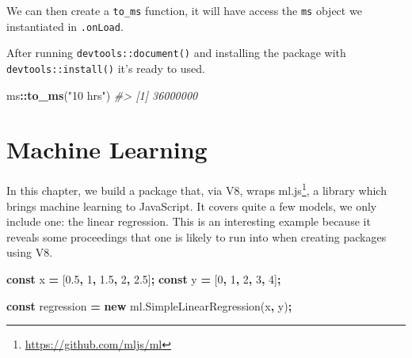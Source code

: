 \documentclass[
]{krantz}
\makeatletter
\newenvironment{Shaded}{\begin{snugshade}}{\end{snugshade}}
\newcommand{\AttributeTok}[1]{\textcolor[rgb]{0.61,0.61,0.61}{#1}}
\newcommand{\CommentTok}[1]{\textcolor[rgb]{0.37,0.37,0.37}{\textit{#1}}}
\newcommand{\ControlFlowTok}[1]{\textcolor[rgb]{0.27,0.27,0.27}{\textbf{#1}}}
\newcommand{\DecValTok}[1]{\textcolor[rgb]{0.06,0.06,0.06}{#1}}
\newcommand{\FloatTok}[1]{\textcolor[rgb]{0.06,0.06,0.06}{#1}}
\newcommand{\KeywordTok}[1]{\textcolor[rgb]{0.27,0.27,0.27}{\textbf{#1}}}
\newcommand{\NormalTok}[1]{#1}
\newcommand{\OperatorTok}[1]{\textcolor[rgb]{0.43,0.43,0.43}{\textbf{#1}}}
\newcommand{\StringTok}[1]{\textcolor[rgb]{0.5,0.5,0.5}{#1}}
\newcommand{\VariableTok}[1]{\textcolor[rgb]{0,0,0}{#1}}
\renewcommand{\href}[2]{#2\footnote{\url{#1}}}
\newenvironment{kframe}{%
\medskip{}
\setlength{\fboxsep}{.8em}
 \def\at@end@of@kframe{}%
 \ifinner\ifhmode%
  \def\at@end@of@kframe{\end{minipage}}%
  \begin{minipage}{\columnwidth}%
 \fi\fi%
 \def\FrameCommand##1{\hskip\@totalleftmargin \hskip-\fboxsep
 \colorbox{shadecolor}{##1}\hskip-\fboxsep
     \hskip-\linewidth \hskip-\@totalleftmargin \hskip\columnwidth}%
 \MakeFramed {\advance\hsize-\width
   \@totalleftmargin\z@ \linewidth\hsize
   \@setminipage}}%
 {\par\unskip\endMakeFramed%
 \at@end@of@kframe}
\renewenvironment{Shaded}{\begin{kframe}}{\end{kframe}}
\makeatother
\begin{document}
We can then create a \texttt{to\_ms} function, it will have access the \texttt{ms} object we instantiated in \texttt{.onLoad}.

\begin{Shaded}
\end{Shaded}

After running \texttt{devtools::document()} and installing the package with \texttt{devtools::install()} it's ready to used.

\begin{Shaded}
\begin{Highlighting}[]
\NormalTok{ms}\OperatorTok{::}\KeywordTok{to\_ms}\NormalTok{(}\StringTok{"10 hrs"}\NormalTok{)}
\CommentTok{\#> [1] 36000000}
\end{Highlighting}
\end{Shaded}

\hypertarget{v8-ml}{%
\chapter{Machine Learning}\label{v8-ml}}

In this chapter, we build a package that, via V8, wraps \href{https://github.com/mljs/ml}{ml.js}, a library which brings machine learning to JavaScript. It covers quite a few models, we only include one: the linear regression. This is an interesting example because it reveals some proceedings that one is likely to run into when creating packages using V8.

\begin{Shaded}
\begin{Highlighting}[]
\KeywordTok{const}\NormalTok{ x }\OperatorTok{=}\NormalTok{ [}\FloatTok{0.5}\OperatorTok{,} \DecValTok{1}\OperatorTok{,} \FloatTok{1.5}\OperatorTok{,} \DecValTok{2}\OperatorTok{,} \FloatTok{2.5}\NormalTok{]}\OperatorTok{;}
\KeywordTok{const}\NormalTok{ y }\OperatorTok{=}\NormalTok{ [}\DecValTok{0}\OperatorTok{,} \DecValTok{1}\OperatorTok{,} \DecValTok{2}\OperatorTok{,} \DecValTok{3}\OperatorTok{,} \DecValTok{4}\NormalTok{]}\OperatorTok{;}

\KeywordTok{const}\NormalTok{ regression }\OperatorTok{=} \KeywordTok{new} \VariableTok{ml}\NormalTok{.}\AttributeTok{SimpleLinearRegression}\NormalTok{(x}\OperatorTok{,}\NormalTok{ y)}\OperatorTok{;}
\end{Highlighting}
\end{Shaded}
\end{document}
